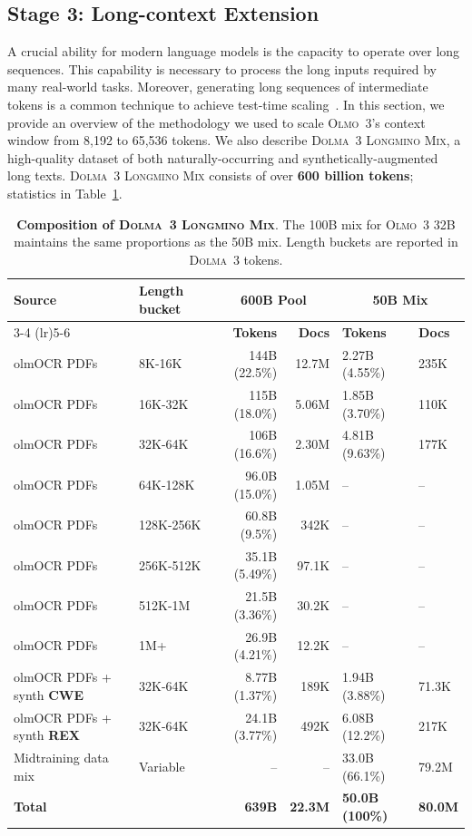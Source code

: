 \documentclass[table]{ai2style/ai2}
\newcommand{\newOlmo}{Olmo\xspace}
\newcommand{\olmothree}{\textsc{\newOlmo~3}\xspace}
\newcommand{\dolmatoo}{\textsc{Dolma~3}\xspace}
\newcommand{\longminomix}{\textsc{Dolma~3 Longmino Mix}\xspace}
\begin{document}
\subsection{Stage 3: Long-context Extension}
\label{sec:long-context}

A crucial ability for modern language models is the capacity to operate over long sequences.
This capability is necessary to process the long inputs required by many real-world tasks.
Moreover, generating long sequences of intermediate tokens is a common technique to achieve test-time scaling~\citep{muennighoff2025s1simpletesttimescaling}.
In this section, we provide an overview of the methodology we used to scale \olmothree's context window from 8,192 to 65,536 tokens. 
We also describe \longminomix{}, a high-quality dataset of both naturally-occurring and synthetically-augmented long texts.
\longminomix{} consists of over {\bf 600 billion tokens}; statistics in Table~\ref{table:data-stage-3}.

\begin{table}[h]
\centering
\footnotesize
\renewcommand{\arraystretch}{1}
\begin{tabular}{l l rr ll}
\toprule
{\bf Source} & 
\bf Length bucket & 
\multicolumn{2}{c}{{\bf 600B Pool}} & 
\multicolumn{2}{c}{{\bf 50B Mix}} \\
\cmidrule(lr){3-4} \cmidrule(lr){5-6}
& & {\bf Tokens} & {\bf Docs} & {\bf Tokens} & {\bf Docs} \\
\midrule
\rowcolor{ai2offwhite}olmOCR PDFs & 8K-16K & 144B (22.5\%) & 12.7M & 2.27B (4.55\%) & 235K \\
olmOCR PDFs & 16K-32K  & 115B (18.0\%) & 5.06M & 1.85B (3.70\%) & 110K \\
\rowcolor{ai2offwhite} olmOCR PDFs & 32K-64K & 106B (16.6\%) & 2.30M & 4.81B (9.63\%) & 177K  \\

olmOCR PDFs &  64K-128K & 96.0B (15.0\%) & 1.05M & -- & -- \\
\rowcolor{ai2offwhite} olmOCR PDFs & 128K-256K  & 60.8B (9.5\%) & 342K & -- & -- \\
olmOCR PDFs  & 256K-512K & 35.1B (5.49\%) & 97.1K & -- &  -- \\
\rowcolor{ai2offwhite}olmOCR PDFs  & 512K-1M & 21.5B (3.36\%) & 30.2K & -- & -- \\
olmOCR PDFs & 1M+ & 26.9B (4.21\%) & 12.2K & -- & -- \\
\rowcolor{ai2offwhite} olmOCR PDFs + synth {\bf{CWE}} & 32K-64K & 8.77B (1.37\%) & 189K & 1.94B (3.88\%) & 71.3K  \\
olmOCR PDFs + synth {\bf{REX}}  & 32K-64K  & 24.1B (3.77\%) & 492K & 6.08B (12.2\%) & 217K \\ 
\rowcolor{ai2offwhite}Midtraining data mix & Variable & -- & -- & 33.0B (66.1\%) & 79.2M \\
{\bf Total} & & {\bf 639B} & {\bf 22.3M} & {\bf 50.0B (100\%)} & {\bf 80.0M} \\
\bottomrule
\end{tabular}
\caption{\textbf{Composition of \longminomix}. The 100B mix for \olmothree 32B maintains the same proportions as the 50B mix. Length buckets are reported in \dolmatoo tokens.}
\label{table:data-stage-3}
\end{table}
\end{document}
